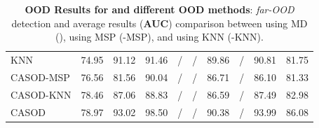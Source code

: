 \begin{table}[t!]
{\begin{tabular}{|l|c|cccccc|c|c|}
			KNN           &  74.95 & 91.12 & 91.46 & \slash & \slash & 89.86 & \slash & 90.81 & 81.75 \\ %
			CASOD-MSP   &  76.56 & 81.56 & 90.04 & \slash & \slash & 86.71 & \slash & 86.10 & 81.33  \\
			CASOD-KNN   &  78.46 & 87.06 & 88.83 & \slash & \slash & 86.59 & \slash & 87.49 & 82.98 \\ %
			CASOD       &  78.97 & 93.02 & 98.50  & \slash & \slash & 90.38  & \slash & 93.99 & 86.08  \\ \hline
		\end{tabular}
	}
	\caption{\textbf{OOD Results for \sys and different OOD methods}: \textit{far-OOD} detection and average results (\textbf{AUC}) comparison between \sys using MD (\sys), \sys using MSP (\sys-MSP), and \sys using KNN (\sys-KNN). %
	}
	\label{tab:table_oodmethods_f}
\end{table}


